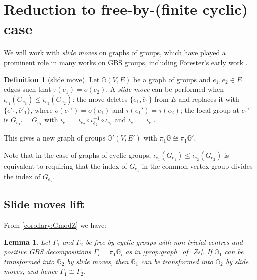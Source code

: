 \documentclass[11pt, a4 paper]{amsart}
\numberwithin{equation}{section}
\newtheorem{lemma}[theorem]{Lemma}
\theoremstyle{remark}
\theoremstyle{definition}
\newtheorem{definition}[theorem]{Definition}
\def\G{\Gamma}
\def\-{\overline}
\def\GG{\mathbb{G}}
\def\t{\tau}
\def\-{\overline}
\def\G{\Gamma}
\begin{document}
\section{Reduction to free-by-(finite cyclic) case}
\label{sec:reduction}

We will work with \emph{slide moves} on graphs of groups, 
which have played a prominent role in many works on GBS groups, 
including Forester's early work \cite{forester2002deformation}. 

\begin{definition}%
[slide move]
	Let $\GG(V,E)$ be a graph of groups and ${e_1, e_2\in E}$
	edges such that $\t(e_1) = o(e_2)$. 
	A \emph{slide move} can be performed when
	$\iota_{e_1}(G_{e_1}) \leq \iota_{\bar e_2}(G_{e_2})$: 
	the move deletes $\{e_1, \-e_1\}$ from $E$ 
	and replaces it with $\{e'_1, \-e'_1\}$, 
	where $o(e_1')=o(e_1)$ and $\t(e_1') = \t(e_2)$; 
	the local group at $e_1'$ is $G_{e_1'} = G_{e_1}$ 
	with $\iota_{e_1'} = 
		\iota_{e_2} \circ \iota_{\-e_2}^{-1} \circ \iota_{e_1}$ 
	and $\iota_{\-{e}_1'} = \iota_{\-e_1}$. 
	
	This gives a new graph of groups $\GG'(V,E')$
	with $\pi_1\GG\cong \pi_1\GG'$. 
\end{definition}

Note that in the case of graphs of cyclic groups, 
${\iota_{e_1}(G_{e_1}) \leq \iota_{\bar e_2}(G_{e_2})}$ 
is equivalent to requiring that 
the index of $G_{e_1}$ in the common vertex group 
divides the index of $G_{e_2}$. 

\smallskip


\subsection{Slide moves lift}

From \cref{corollary:GmodZ} we have:

\begin{lemma}
\label{l:lifting_iso}
	Let $\G_1$ and $\G_2$ be free-by-cyclic groups 
	with non-trivial centres and positive GBS decompositions  
	$\G_i=\pi_1\GG_i$ as in \cref{prop:graph_of_Zs}. 
	If $\-{\GG}_1$ can be transformed into $\-{\GG}_2$ 
	by slide moves,  
	then $\GG_1$ can be transformed into $\GG_2$ by slide moves, 
	and hence $\G_1\cong \G_2$. 
\end{lemma}
\end{document}
